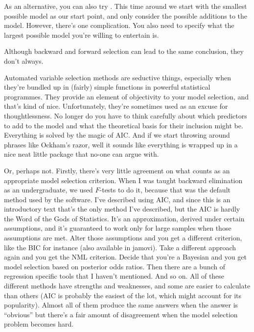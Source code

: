 
As an alternative, you can also try . This time around we start with the smallest possible model as our start point, and only consider the possible additions to the model. However, there's one complication. You also need to specify what the largest possible model you're willing to entertain is.

Although backward and forward selection can lead to the same conclusion, they don't always.


Automated variable selection methods are seductive things, especially when they're bundled up in (fairly) simple functions in powerful statistical programmes. They provide an element of objectivity to your model selection, and that's kind of nice. Unfortunately, they're sometimes used as an excuse for thoughtlessness. No longer do you have to think carefully about which predictors to add to the model and what the theoretical basis for their inclusion might be. Everything is solved by the magic of AIC. And if we start throwing around phrases like Ockham's razor, well it sounds like everything is wrapped up in a nice neat little package that no-one can argue with.

Or, perhaps not. Firstly, there's very little agreement on what counts as an appropriate model selection criterion. When I was taught backward elimination as an undergraduate, we used $F$-tests to do it, because that was the default method used by the software. I've described using AIC, and since this is an introductory text that's the only method I've described, but the AIC is hardly the Word of the Gods of Statistics. It's an approximation, derived under certain assumptions, and it's guaranteed to work only for large samples when those assumptions are met. Alter those assumptions and you get a different criterion, like the BIC for instance (also available in jamovi). Take a different approach again and you get the NML criterion. Decide that you're a Bayesian and you get model selection based on posterior odds ratios. Then there are a bunch of regression specific tools that I haven't mentioned. And so on. All of these different methods have strengths and weaknesses, and some are easier to calculate than others (AIC is probably the easiest of the lot, which might account for its popularity). Almost all of them produce the same answers when the answer is ``obvious'' but there's a fair amount of disagreement when the model selection problem becomes hard.

